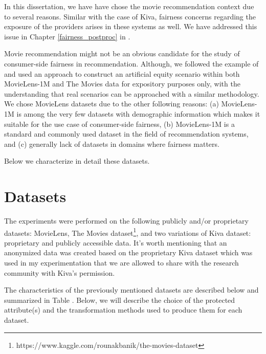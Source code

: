    In this dissertation, we have have chose the movie recommendation context due to several reasons. Similar with the case of Kiva, fairness concerns regarding the exposure of the providers arises in these systems as well. We have addressed this issue in Chapter \ref{fairness_postproc} in \cite{sonboli2020opportunistic,liu2019farpfar} .
    
    Movie recommendation might not be an obvious candidate for the study of consumer-side fairness in recommendation. Although, we followed the example of \cite{yao2017beyond} and used an approach to construct an artificial equity scenario within both MovieLens-1M and The Movies data for expository purposes only, with the understanding that real scenarios can be approached with a similar methodology. We chose MovieLens datasets due to the other following reasons: (a) MovieLens-1M is among the very few datasets with demographic information which makes it suitable for the use case of consumer-side fairness, (b) MovieLens-1M is a standard and commonly used dataset in the field of recommendation systems, and (c) generally lack of datasets in domains where fairness matters.

    Below we characterize in detail these datasets.
    
\section{Datasets}

The experiments were performed on the following publicly and/or proprietary datasets: MovieLens\cite{movielens}, The Movies dataset\footnote{https://www.kaggle.com/rounakbanik/the-movies-dataset}, and two variations of Kiva dataset: proprietary and publicly accessible data.
It's worth mentioning that an anonymized data was created based on the proprietary Kiva dataset which was used in my experimentation that we are allowed to share with the research community with Kiva's permission.



The characteristics of the previously mentioned datasets are described below and summarized in Table . Below, we will describe the choice of the protected attribute(s) and the transformation methods used to produce them for each dataset.

